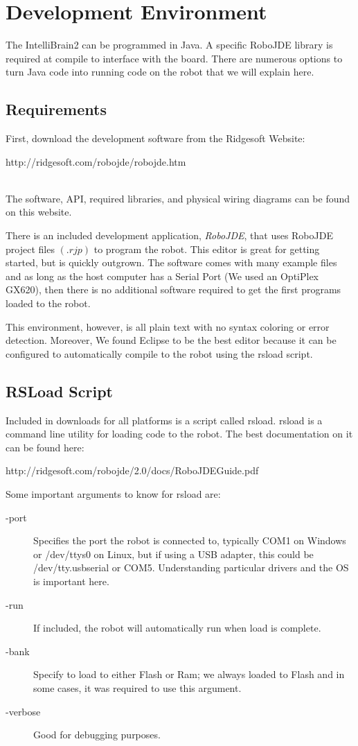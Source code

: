 \documentclass[12pt]{article}
\begin{document}
\clearpage
\section{Development Environment}
The IntelliBrain2 can be programmed in Java.  A specific RoboJDE library is required at compile to interface with the board.  There are numerous options to turn Java code into running code on the robot that we will explain here.
\subsection{Requirements}
First, download the development software from the Ridgesoft Website:\\
{\color{blue}\centerline{http://ridgesoft.com/robojde/robojde.htm}}\\
The software, API, required libraries, and physical wiring diagrams can be found on this website.

There is an included development application, \textit{RoboJDE}, that uses RoboJDE project files $(.rjp)$ to program the robot.  This editor is great for getting started, but is quickly outgrown.  The software comes with many example files and as long as the host computer has a Serial Port (We used an OptiPlex GX620), then there is no additional software required to get the first programs loaded to the robot.

This environment, however, is all plain text with no syntax coloring or error detection.  Moreover, We found Eclipse to be the best editor because it can be configured to automatically compile to the robot using the rsload script.

\subsection{RSLoad Script}
Included in downloads for all platforms is a script called rsload.  rsload is a command line utility for loading code to the robot.  The best documentation on it can be found here:\\
{\color{blue}\centerline{http://ridgesoft.com/robojde/2.0/docs/RoboJDEGuide.pdf}}
Some important arguments to know for rsload are:
\begin{description}

\item[-port] Specifies the port the robot is connected to, typically COM1 on Windows or /dev/ttys0 on Linux, but if using a USB adapter, this could be /dev/tty.usbserial or COM5.  Understanding particular drivers and the OS is important here.
\item[-run] If included, the robot will automatically run when load is complete.
\item[-bank] Specify to load to either Flash or Ram; we always loaded to Flash and in some cases, it was required to use this argument.
\item[-verbose] Good for debugging purposes.
\end{description}
\end{document}
